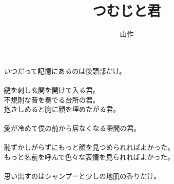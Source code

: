 \documentclass[a5j,12pt]{tbook}
\title{つむじと君}
\author{\rensuji{J}山\rensuji{B}作}
\date{}
\begin{document}
\maketitle

いつだって記憶にあるのは後頭部だけ。\\
\\
鍵を刺し玄関を開けて入る君。\\
不規則な音を奏でる台所の君。\\
抱きしめると胸に顔を埋めたがる君。\\
\\
愛が冷めて僕の前から居なくなる瞬間の君。\\
\\
恥ずかしがらずにもっと顔を見つめられればよかった。\\
もっと名前を呼んで色々な表情を見られればよかった。\\
\\
思い出すのはシャンプーと少しの地肌の香りだけ。
\end{document}
